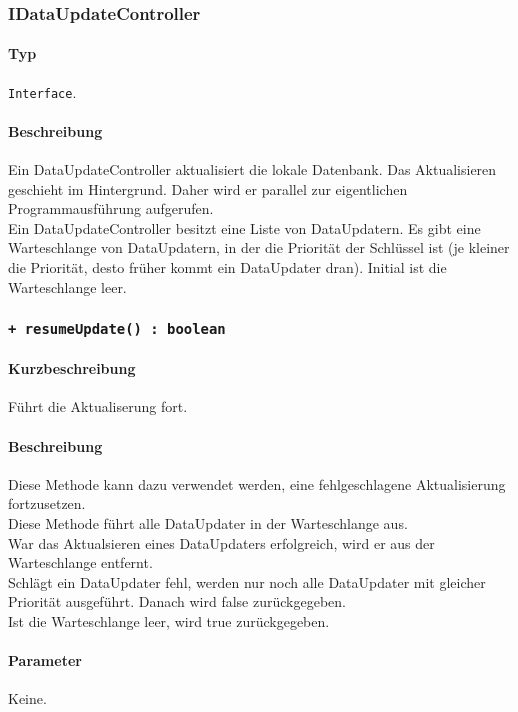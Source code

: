 \subsubsection{IDataUpdateController}\label{App_DocumentViewer_IDataupdateController}
\paragraph*{Typ}
\texttt{Interface}.
\paragraph*{Beschreibung}
Ein DataUpdateController aktualisiert die lokale Datenbank. Das Aktualisieren geschieht im 
Hintergrund. Daher wird er parallel zur eigentlichen Programmausführung aufgerufen.\\
Ein DataUpdateController besitzt eine Liste von DataUpdatern.
Es gibt eine Warteschlange von DataUpdatern, in der die Priorität der Schlüssel ist (je kleiner 
die Priorität, desto früher kommt ein DataUpdater dran). Initial ist die Warteschlange leer.\\


\subsubsection*{\texttt{+ resumeUpdate() : boolean}}\label{App_DocumentViewer_IDataupdateController_resumeUpdate}%
\paragraph*{Kurzbeschreibung}
Führt die Aktualiserung fort.
\paragraph*{Beschreibung}
Diese Methode kann dazu verwendet werden, eine fehlgeschlagene Aktualisierung fortzusetzen.\\
Diese Methode führt alle DataUpdater in der Warteschlange aus.\\
War das Aktualsieren eines DataUpdaters erfolgreich, wird er aus der Warteschlange entfernt.\\
Schlägt ein DataUpdater fehl, werden nur noch alle DataUpdater mit gleicher Priorität 
ausgeführt. Danach wird false zurückgegeben.\\
Ist die Warteschlange leer, wird true zurückgegeben.\\
\paragraph*{Parameter}
Keine.
